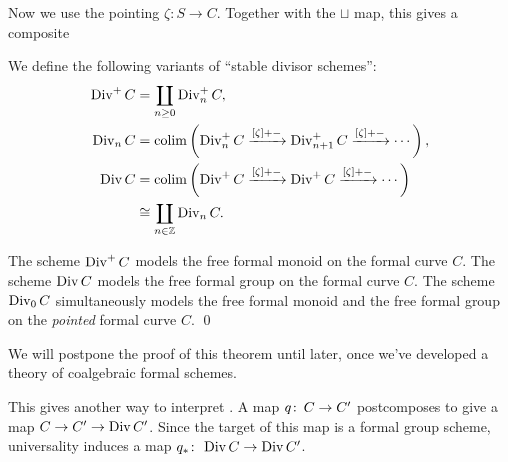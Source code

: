 Now we use the pointing $\zeta: S \to C$.  Together with the $\sqcup$ map, this gives a composite
\begin{center}
\end{center}

\begin{definition}\label{StableDivisorSchemeDefn}
We define the following variants of ``stable divisor schemes'':
\begin{align*}
\operatorname{Div}^+ C & = \coprod_{n \ge 0} \operatorname{Div}_n^+ C, \\
\operatorname{Div}_n C & = \operatorname*{colim} \left( \operatorname{Div}_n^+ C \xrightarrow{[\zeta] + -} \operatorname{Div}_{n+1}^+ C \xrightarrow{[\zeta] + -} \cdots \right), \\
\operatorname{Div} C & = \operatorname*{colim} \left( \operatorname{Div}^+ C \xrightarrow{[\zeta] + -} \operatorname{Div}^+ C \xrightarrow{[\zeta] + -} \cdots \right) \\
& \cong \coprod_{n \in \mathbb Z} \operatorname{Div}_n C.
\end{align*}
\end{definition}

\begin{theorem}
The scheme $\operatorname{Div}^+ C$ models the free formal monoid on the formal curve $C$.  The scheme $\operatorname{Div} C$ models the free formal group on the formal curve $C$.  The scheme $\operatorname{Div}_0 C$ simultaneously models the free formal monoid and the free formal group on the \emph{pointed} formal curve $C$. \qed {}
\end{theorem}
\noindent We will postpone the proof of this theorem until later, once we've developed a theory of coalgebraic formal schemes.

\begin{remark}
This gives another way to interpret .  A map $q\colon\thinspace C \to C'$ postcomposes to give a map $C \to C' \to \operatorname{Div} C'$.  Since the target of this map is a formal group scheme, universality induces a map $q_*\colon\thinspace \operatorname{Div} C \to \operatorname{Div} C'$.
\end{remark}

